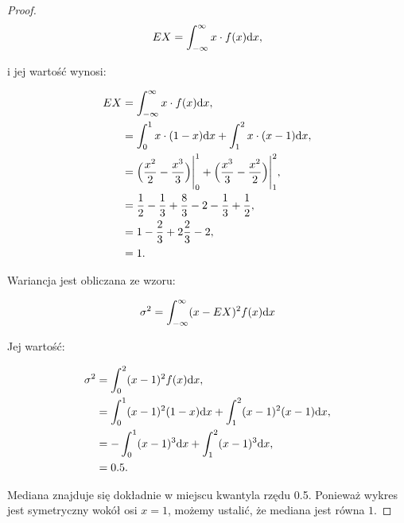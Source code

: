 \documentclass[11pt]{article}
\theoremstyle{definition}
\numberwithin{zadanie}{section}
\begin{document}
\begin{proof}
    $$EX = \int_{-\infty}^\infty x\cdot f(x)\text dx,$$

    i jej wartość wynosi:

    \begin{align*}
        EX & =\int_{-\infty}^\infty x\cdot f(x)\text dx,                                                  \\
           & = \int_0^1 x\cdot(1-x)\text dx + \int_1^2x\cdot(x-1)\text dx,                                \\
           & = \Big(\frac{x^2}2-\frac{x^3}3\Big)\Bigg|_0^1 + \Big(\frac{x^3}3-\frac{x^2}2\Big)\Bigg|_1^2, \\
           & = \frac12-\frac13 + \frac83-2 - \frac13+\frac12,                                             \\
           & = 1-\frac23+2\frac23-2,                                                                      \\
           & = 1.
    \end{align*}

    Wariancja jest obliczana ze wzoru:

    $$\sigma^2 = \int_{-\infty}^\infty(x-EX)^2f(x)\text dx$$

    Jej wartość:

    \begin{align*}
        \sigma^2 & =  \int_{0}^2(x-1)^2f(x)\text dx,                                 \\
                 & =  \int_{0}^1(x-1)^2(1-x)\text dx+\int_{1}^2(x-1)^2(x-1)\text dx, \\
                 & =  -\int_{0}^1(x-1)^3\text dx+\int_{1}^2(x-1)^3\text dx,          \\
                 & = 0.5.
    \end{align*}

    Mediana znajduje się dokładnie w miejscu kwantyla rzędu 0.5. Ponieważ wykres jest symetryczny wokół osi $x=1$, możemy ustalić, że mediana jest równa $1$.
\end{proof}
\end{document}
